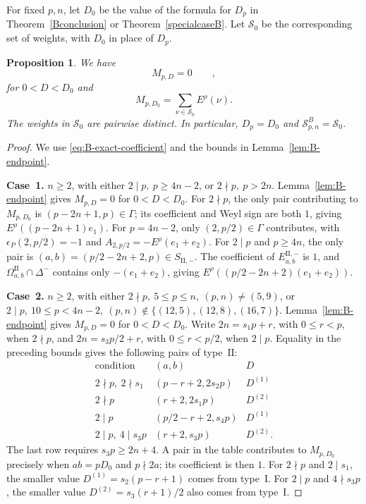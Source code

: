 \documentclass[11pt,a4paper]{amsart}
\theoremstyle{plain}
\newtheorem{prop}[theorem]{Proposition}
\numberwithin{equation}{section}
\newenvironment{pf}{\begin{proof}}{\end{proof}}
\begin{document}
For fixed \(p,n\), let \(D_0\) be the value of the formula for
\(D_p\) in Theorem~\ref{Bconclusion} or Theorem~\ref{specialcaseB}.
Let \(\mathcal S_0\) be the corresponding set of weights, with
\(D_0\) in place of \(D_p\).

\begin{prop}\label{prop:B-first-layer}
	We have
	\[
	M_{p,D}=0\qquad,
	\]
for $0<D<D_0$	and
	\begin{equation}\label{eq:B-remaining-first-layer}
		M_{p,D_0}
		=\sum_{\nu\in\mathcal S_0}E^\rho(\nu).
	\end{equation}
	The weights in \(\mathcal S_0\) are pairwise distinct. In particular,
	\(D_p=D_0\) and \(\mathcal S^B_{p,n}=\mathcal S_0\).
\end{prop}

\begin{pf}
	We use \eqref{eq:B-exact-coefficient} and the bounds in
	Lemma~\ref{lem:B-endpoint}.
	
	\smallskip
	
	\noindent\textbf{Case~1.} \(n\ge2\), with either \(2\mid p,\ p\ge4n-2\), or \(2\nmid p,\ p>2n\).
	Lemma~\ref{lem:B-endpoint} gives \(M_{p,D}=0\) for \(0<D<D_0\).
	For \(2\nmid p\), the only pair contributing to \(M_{p,D_0}\)
	is \((p-2n+1,p)\in\Gamma\); its coefficient and Weyl sign are
	both \(1\), giving \(E^\rho((p-2n+1)e_1)\).
	For \(p=4n-2\), only \((2,p/2)\in\Gamma\) contributes, with
	\(\epsilon_P(2,p/2)=-1\) and \(A_{2,p/2}=-E^\rho(e_1+e_2)\).
	For \(2\mid p\) and \(p\ge4n\), the only pair is
	\((a,b)=(p/2-2n+2,p)\in S_{\mathrm{II},-}\).
	The coefficient of \(E_{a,b}^{\mathrm{II},-}\) is \(1\), and
	\(\Omega_{a,b}^{\mathrm{II}}\cap\Delta^-\) contains only
	\(-(e_1+e_2)\), giving \(E^\rho((p/2-2n+2)(e_1+e_2))\).
	
	\smallskip
	
	\noindent\textbf{Case~2.} \(n\ge2\), with either
	\(2\nmid p,\ 5\le p\le n,\ (p,n)\ne(5,9)\), or
	\(2\mid p,\ 10\le p<4n-2,\ (p,n)\notin\{(12,5),(12,8),(16,7)\}\).
	Lemma~\ref{lem:B-endpoint} gives \(M_{p,D}=0\) for \(0<D<D_0\).
	Write \(2n=s_1p+r\), with \(0\le r<p\), when \(2\nmid p\),
	and \(2n=s_3p/2+r\), with \(0\le r<p/2\), when \(2\mid p\).
	Equality in the preceding bounds gives the following pairs of
	type~\(\mathrm{II}\):
	\[
	\begin{array}{c|c|c}
		\text{condition}&(a,b)&D\\ \hline
		2\nmid p,\ 2\nmid s_1&(p-r+2,2s_2p)&D^{(1)}\\
		2\nmid p&(r+2,2s_1p)&D^{(2)}\\
		2\mid p&(p/2-r+2,s_4p)&D^{(1)}\\
		2\mid p,\ 4\mid s_3p&(r+2,s_3p)&D^{(2)}.
	\end{array}
	\]
	The last row requires \(s_3p\ge2n+4\).
	A pair in the table contributes to \(M_{p,D_0}\) precisely when
	\(ab=pD_0\) and \(p\nmid2a\); its coefficient is then \(1\).
	For \(2\nmid p\) and \(2\mid s_1\), the smaller value
	\(D^{(1)}=s_2(p-r+1)\) comes from type~\(\mathrm I\).
	For \(2\mid p\) and \(4\nmid s_3p\), the smaller value
	\(D^{(2)}=s_3(r+1)/2\) also comes from type~\(\mathrm I\).
	

\end{pf}
\end{document}
